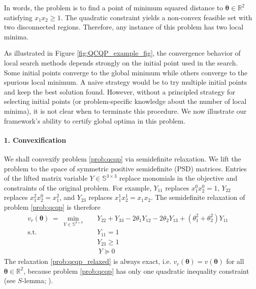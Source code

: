 \documentclass[10pt]{article} %
\theoremstyle{plain}
\theoremstyle{definition}
\theoremstyle{remark}
\begin{document}
In words, the problem is to find a point of minimum squared distance to $\bm{\theta} \in \mathbb{R}^2$ satisfying $x_1 x_2 \geq 1$. The quadratic constraint yields a non-convex feasible set with two disconnected regions. Therefore, any instance of this problem has two local minima.

As illustrated in Figure \ref{fig:QCQP_example_fig}, the convergence behavior of local search methods depends strongly on the initial point used in the search. Some initial points converge to the global minimum while others converge to the spurious local minimum. A naive strategy would be to try multiple initial points and keep the best solution found. However, without a principled strategy for selecting initial points (or problem-specific knowledge about the number of local minima), it is not clear when to terminate this procedure. We now illustrate our framework's ability to certify global optima in this problem.

\paragraph{1. Convexification} We shall convexify problem \cref{prob:qcqp} via semidefinite relaxation. We lift the problem to the space of symmetric positive semidefinite (PSD) matrices. Entries of the lifted matrix variable $Y \in \mathbb{S}^{3 \times 3}$ replace monomials in the objective and constraints of the original problem. For example, $Y_{11}$ replaces $x_1^0 x_2^0 = 1$, $Y_{22}$ replaces $x_1^2 x_2^0 = x_1^2$, and $Y_{23}$ replaces $x_1^1 x_2^1 = x_1 x_2$. The semidefinite relaxation of problem \cref{prob:qcqp} is therefore
\begin{equation}
\begin{aligned}
v_r(\bm{\theta}) ~=~ \min_{Y \in \mathbb{S}^{3 \times 3}} \quad 
&Y_{22} + Y_{33} - 2 \theta_1 Y_{12} - 2 \theta_2 Y_{13} + (\theta_1^2 + \theta_2^2) Y_{11} \\ 
\text{s.t.}\quad & Y_{11} = 1 \\[3pt]
& Y_{23} \geq 1 \\[4pt]
& ~Y \succeq 0
\end{aligned}
\label{prob:qcqp_relaxed}
\end{equation}
The relaxation \cref{prob:qcqp_relaxed} is always exact, i.e. $v_r(\bm{\theta}) = v(\bm{\theta})$ for all $\bm{\theta} \in \mathbb{R}^2$, because problem \cref{prob:qcqp}{}{} has only one quadratic inequality constraint (see $S$-lemma; \cite{boyd2004convex}). 
\end{document}
